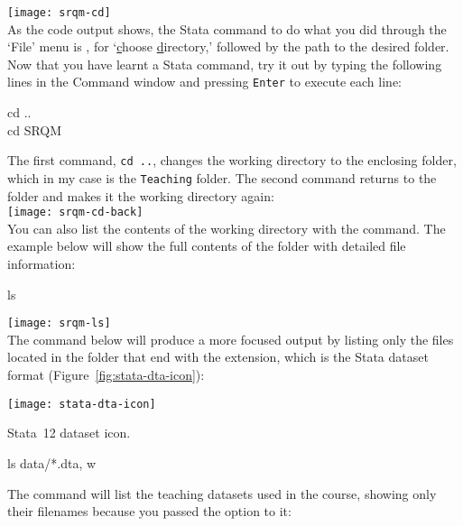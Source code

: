 		\texttt{[image: srqm-cd]}\\[1em]

	As the code output shows, the Stata command to do what you did through the `File' menu is , for `\underline{c}hoose \underline{d}irectory,' followed by the path to the desired folder. Now that you have learnt a Stata command, try it out by typing the following lines in the Command window and pressing \texttt{Enter} to execute each line:%
	
	\begin{docspec}
		cd ..\\
		cd SRQM
	\end{docspec}
	
	The first command, \texttt{cd ..}, changes the working directory to the enclosing folder, which in my case is the \texttt{Teaching} folder. The second command returns to the \SRQM folder and makes it the working directory again:\\[1em]%
		
	\texttt{[image: srqm-cd-back]}\\[1em]
	
	You can also list the contents of the working directory with the  command. The example below will show the full contents of the \SRQM folder with detailed file information:%
	
		\begin{docspec}
			ls
		\end{docspec}

		\texttt{[image: srqm-ls]}\\[1em]
			
	The  command below will produce a more focused output by listing only the files located in the \data folder that end with the  extension, which is the Stata dataset format (Figure~\ref{fig:stata-dta-icon}):%

		\begin{marginfigure}
			\texttt{[image: stata-dta-icon]}
			\caption{Stata~12 dataset icon.}
			\label{fig:stata-dta-icon}
		\end{marginfigure}

		\begin{docspec}
			ls data/*.dta, w
		\end{docspec}
			 
	The command will list the teaching datasets used in the course, showing only their filenames because you passed the  option to it:\\[1em]%
 
